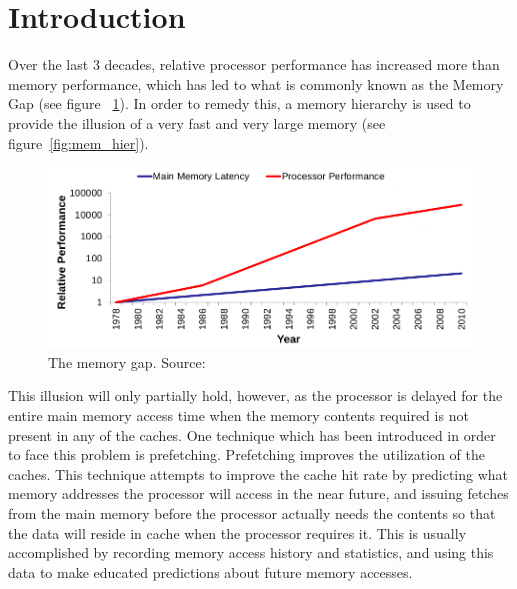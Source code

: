 
\section{Introduction}
\label{sec:introduction}
Over the last 3 decades, relative processor performance has increased more than memory performance,
which has led to what is commonly known as the Memory Gap (see figure ~\ref{fig:mem_gap}). In order to remedy this, a memory
hierarchy is used to provide the illusion of a very fast and very
large memory (see figure~\ref{fig:mem_hier}). \cite{tdt4260lect} 

\begin{figure}[H]
	\centering
	\includegraphics[scale=0.27]{./figures/memwall}
	\caption{The memory gap. Source:\cite{tdt4260lect}}
	\label{fig:mem_gap}
\end{figure}

This illusion will only partially hold, however, as the processor is
delayed for the entire main memory access time when the memory contents required
is not present in any of the caches. One technique
which has been introduced in order to face this problem is prefetching. Prefetching improves the utilization of the caches. This technique
attempts to improve the cache hit rate by predicting what memory
addresses the processor will access in the near future, and
issuing fetches from the main memory before the processor actually
needs the contents so that the data will reside in cache when the
processor requires it. This is usually accomplished by recording
memory access history and statistics, and using this data to make educated
predictions about future memory accesses.\cite{Grannas} 

